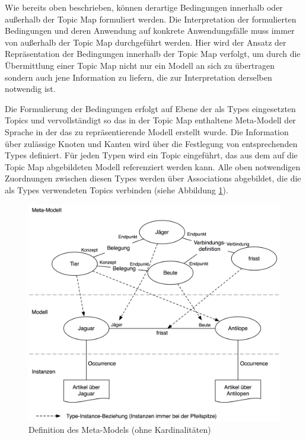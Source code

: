 Wie bereits oben beschrieben, können derartige Bedingungen innerhalb oder außerhalb der Topic Map formuliert werden. Die Interpretation der formulierten Bedingungen und deren Anwendung auf konkrete Anwendungsfälle muss immer von außerhalb der Topic Map durchgeführt werden. Hier wird der Ansatz der Repräsentation der Bedingungen innerhalb der Topic Map verfolgt, um durch die Übermittlung einer Topic Map nicht nur ein Modell an sich zu übertragen sondern auch jene Information zu liefern, die zur Interpretation derselben notwendig ist.

Die Formulierung der Bedingungen erfolgt auf Ebene der als Types eingesetzten Topics und vervollständigt so das in der Topic Map enthaltene Meta-Modell der Sprache in der das zu repräsentierende Modell erstellt wurde. Die Information über zulässige Knoten und Kanten wird über die Festlegung von entsprechenden Types definiert. Für jeden Typen wird ein Topic eingeführt, das aus dem auf die Topic Map abgebildeten Modell referenziert werden kann. Alle oben notwendigen Zuordnungen zwischen diesen Types werden über Associations abgebildet, die die als Types verwendeten Topics verbinden (siehe Abbildung \ref{fig:img_Persistenz_MetaModelDef}).

\begin{figure}[htbp]
	\centering
		\includegraphics[width=13cm]{img/Persistenz/MetaModelDef.png}
	\caption{Definition des Meta-Models (ohne Kardinalitäten)}
	\label{fig:img_Persistenz_MetaModelDef}
\end{figure}

